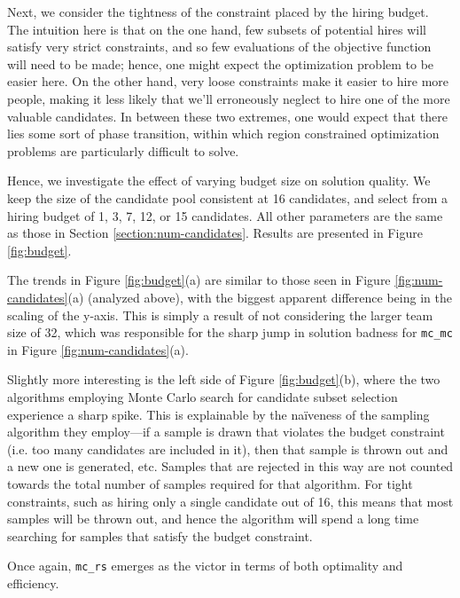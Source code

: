 Next, we consider the tightness of the constraint placed by the hiring budget.
The intuition here is that on the one hand, few subsets of potential hires will satisfy very strict constraints, and so few evaluations of the objective function will need to be made; hence, one might expect the optimization problem to be easier here.
On the other hand, very loose constraints make it easier to hire more people, making it less likely that we'll erroneously neglect to hire one of the more valuable candidates.
In between these two extremes, one would expect that there lies some sort of phase transition, within which region constrained optimization problems are particularly difficult to solve.

Hence, we investigate the effect of varying budget size on solution quality.
We keep the size of the candidate pool consistent at 16 candidates, and select from a hiring budget of 1, 3, 7, 12, or 15 candidates.
All other parameters are the same as those in Section \ref{section:num-candidates}.
Results are presented in Figure \ref{fig:budget}.

The trends in Figure \ref{fig:budget}(a) are similar to those seen in Figure \ref{fig:num-candidates}(a) (analyzed above), with the biggest apparent difference being in the scaling of the y-axis.
This is simply a result of not considering the larger team size of 32, which was responsible for the sharp jump in solution badness for \texttt{mc\_mc} in Figure \ref{fig:num-candidates}(a).

Slightly more interesting is the left side of Figure \ref{fig:budget}(b), where the two algorithms employing Monte Carlo search for candidate subset selection experience a sharp spike.
This is explainable by the na\"iveness of the sampling algorithm they employ---if a sample is drawn that violates the budget constraint (i.e. too many candidates are included in it), then that sample is thrown out and a new one is generated, etc.
Samples that are rejected in this way are not counted towards the total number of samples required for that algorithm.
For tight constraints, such as hiring only a single candidate out of 16, this means that most samples will be thrown out, and hence the algorithm will spend a long time searching for samples that satisfy the budget constraint.

Once again, \texttt{mc\_rs} emerges as the victor in terms of both optimality and efficiency.

